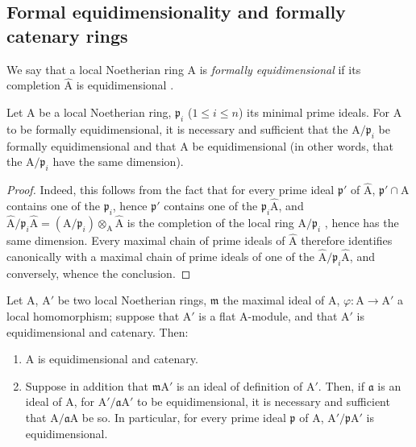 \subsection{Formal equidimensionality and formally catenary rings}
\label{subsection:IV.7.1}


\begin{definition}[7.1.1]
\label{IV.7.1.1}
We say that a local Noetherian ring $\mathrm{A}$ is \emph{formally equidimensional} if its completion $\widehat{\mathrm{A}}$ is equidimensional .
\end{definition}

\begin{proposition}[7.1.2]
\label{IV.7.1.2}
Let $\mathrm{A}$ be a local Noetherian ring, $\mathfrak{p}_i$ ($1\leqslant i\leqslant n$) its minimal prime ideals.
For $\mathrm{A}$ to be formally equidimensional, it is necessary and sufficient that the $\mathrm{A}/\mathfrak{p}_i$ be formally equidimensional and that $\mathrm{A}$ be equidimensional (in other words, that the $\mathrm{A}/\mathfrak{p}_i$ have the same dimension).
\end{proposition}

\begin{proof}
Indeed, this follows from the fact that for every prime ideal $\mathfrak{p}'$ of $\widehat{\mathrm{A}}$, $\mathfrak{p}'\cap\mathrm{A}$ contains one of the $\mathfrak{p}_i$, hence $\mathfrak{p}'$ contains one of the $\mathfrak{p}_i\widehat{\mathrm{A}}$, and $\widehat{\mathrm{A}}/\mathfrak{p}_i\widehat{\mathrm{A}}=(\mathrm{A}/\mathfrak{p}_i)\otimes_\mathrm{A}\widehat{\mathrm{A}}$ is the completion of the local ring $\mathrm{A}/\mathfrak{p}_i$ , hence has the same dimension.
Every maximal chain of prime ideals of $\widehat{\mathrm{A}}$ therefore identifies canonically with a maximal chain of prime ideals of one of the $\widehat{\mathrm{A}}/\mathfrak{p}_i\widehat{\mathrm{A}}$, and conversely, whence the conclusion.
\end{proof}

\begin{proposition}[7.1.3]
\label{IV.7.1.3}
Let $\mathrm{A}$, $\mathrm{A}'$ be two local Noetherian rings, $\mathfrak{m}$ the maximal ideal of $\mathrm{A}$, $\varphi:\mathrm{A}\to\mathrm{A}'$ a local homomorphism; suppose that $\mathrm{A}'$ is a flat $\mathrm{A}$-module, and that $\mathrm{A}'$ is equidimensional and catenary.
Then:
\begin{enumerate}[label=\emph{\roman*)}]
  \item $\mathrm{A}$ is equidimensional and catenary.
  \item Suppose in addition that $\mathfrak{m}\mathrm{A}'$ is an ideal of definition of $\mathrm{A}'$.
  Then, if $\mathfrak{a}$ is an ideal of $\mathrm{A}$, for $\mathrm{A}'/\mathfrak{a}\mathrm{A}'$ to be equidimensional, it is necessary and sufficient that $\mathrm{A}/\mathfrak{a}\mathrm{A}$ be so.
  In particular, for every prime ideal $\mathfrak{p}$ of $\mathrm{A}$, $\mathrm{A}'/\mathfrak{p}\mathrm{A}'$ is equidimensional.
\end{enumerate}
\end{proposition}

